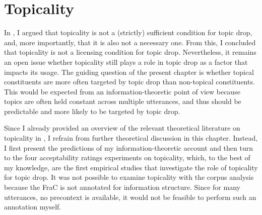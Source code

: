 \chapter{Topicality}\label{ch:factor.topicality}
In , I argued that topicality is not a (strictly) sufficient condition for topic drop, and, more importantly, that it is also not a necessary one.
From this, I concluded that topicality is not a licensing condition for topic drop.
Nevertheless, it remains an open issue whether topicality still plays a role in topic drop as a factor that impacts its usage.
The guiding question of the present chapter is whether topical constituents are more often targeted by topic drop than non-topical constituents.
This would be expected from an information-theoretic point of view because topics are often held constant across multiple utterances, and thus should be predictable  and more likely to be targeted by topic drop.

Since I already provided an overview of the relevant theoretical literature on topicality in , I refrain from further theoretical discussion in this chapter.
Instead, I first present the predictions of my information-theoretic account and then turn to the four acceptability ratings experiments on topicality, which, to the best of my knowledge, are the first empirical studies that investigate the role of topicality for topic drop.
It was not possible to examine topicality with the corpus analysis because the FraC is not annotated for information structure.
Since for many utterances, no precontext is available, it would not be feasible to perform such an annotation myself.

